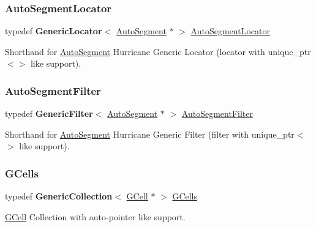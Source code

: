 \subsubsection{\texorpdfstring{Auto\+Segment\+Locator}{AutoSegmentLocator}}
{\footnotesize\ttfamily typedef \textbf{ Generic\+Locator}$<$ \mbox{\hyperlink{classKatabatic_1_1AutoSegment}{Auto\+Segment}} $\ast$ $>$ \mbox{\hyperlink{namespaceKatabatic_ace866cc8e09faf80f71a4087bb8e5870}{Auto\+Segment\+Locator}}}

Shorthand for \mbox{\hyperlink{classKatabatic_1_1AutoSegment}{Auto\+Segment}} Hurricane Generic Locator (locator with {\ttfamily unique\+\_\+ptr$<$$>$} like support). \mbox{\label{namespaceKatabatic_a13ffc994c98e1a878e61a927de0509c8}} 
\subsubsection{\texorpdfstring{Auto\+Segment\+Filter}{AutoSegmentFilter}}
{\footnotesize\ttfamily typedef \textbf{ Generic\+Filter}$<$ \mbox{\hyperlink{classKatabatic_1_1AutoSegment}{Auto\+Segment}} $\ast$ $>$ \mbox{\hyperlink{namespaceKatabatic_a13ffc994c98e1a878e61a927de0509c8}{Auto\+Segment\+Filter}}}

Shorthand for \mbox{\hyperlink{classKatabatic_1_1AutoSegment}{Auto\+Segment}} Hurricane Generic Filter (filter with {\ttfamily unique\+\_\+ptr$<$$>$} like support). \mbox{\label{namespaceKatabatic_ab68f9dfbbc79fd999773beef8561bc31}} 
\subsubsection{\texorpdfstring{G\+Cells}{GCells}}
{\footnotesize\ttfamily typedef \textbf{ Generic\+Collection}$<$ \mbox{\hyperlink{classKatabatic_1_1GCell}{G\+Cell}} $\ast$ $>$ \mbox{\hyperlink{namespaceKatabatic_ab68f9dfbbc79fd999773beef8561bc31}{G\+Cells}}}

\mbox{\hyperlink{classKatabatic_1_1GCell}{G\+Cell}} Collection with auto-\/pointer like support. \mbox{\label{namespaceKatabatic_ae192ef170a0ad390902e435ac1e6796a}} 
